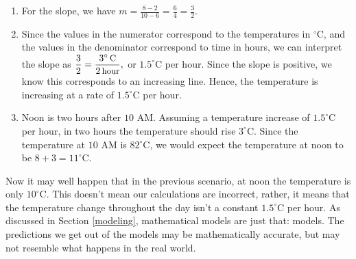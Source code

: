 {
\begin{enumerate}

\item For the slope, we have  $m = \frac{8 - 2}{10 - 6} = \frac{6}{4} = \frac{3}{2}$.  

\item  Since the values in the numerator correspond to the temperatures in $^{\circ}$C, and the values in the denominator correspond to time in hours, we can interpret the slope as $\dfrac{3}{2} = \dfrac{3^{\circ} \, \mbox{\small C}}{2 \, \mbox{\small hour}},$ or $1.5^{\circ}$C per hour.  Since the slope is positive, we know this corresponds to an increasing line.  Hence, the temperature is increasing at a rate of $1.5^{\circ}$C per hour.

\item  Noon is two hours after $10$ AM.  Assuming a temperature increase of $1.5^{\circ}$C per hour, in two hours the temperature should rise $3^{\circ}$C.  Since the temperature at $10$ AM is $82^{\circ}$C, we would expect the temperature at noon to be $8+3=11^{\circ}$C.
\end{enumerate}
}

Now it may well happen that in the previous scenario, at noon the temperature is only $10^{\circ}$C.  This doesn't mean our calculations are incorrect, rather, it means that the temperature change throughout the day isn't a constant $1.5^{\circ}$C per hour. As discussed in Section \ref{modeling}, mathematical models are just that:  models.  The predictions we get out of the models may be mathematically accurate, but may not resemble what happens in the real world. 



